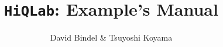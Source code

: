 \documentclass{article}
\newcommand{\hiq}{\texttt{HiQLab}}
\begin{document}
\title{\hiq: Example's Manual}
\author{David Bindel \& Tsuyoshi Koyama}

\maketitle
\newpage
\tableofcontents
\newpage







\end{document}
